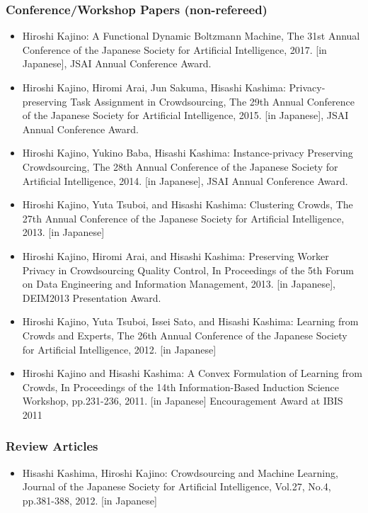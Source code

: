 \documentclass[a4paper,9pt]{article}
\begin{document}
\subsubsection*{Conference/Workshop Papers (non-refereed)}
\begin{itemize}
 \item Hiroshi Kajino: A Functional Dynamic Boltzmann Machine, The 31st Annual Conference of the Japanese Society for Artificial Intelligence, 2017. [in Japanese], JSAI Annual Conference Award.
 \item Hiroshi Kajino, Hiromi Arai, Jun Sakuma, Hisashi Kashima: Privacy-preserving Task Assignment in Crowdsourcing, The 29th Annual Conference of the Japanese Society for Artificial Intelligence, 2015. [in Japanese], JSAI Annual Conference Award.
 \item Hiroshi Kajino, Yukino Baba, Hisashi Kashima: Instance-privacy Preserving Crowdsourcing, The 28th Annual Conference of the Japanese Society for Artificial Intelligence, 2014. [in Japanese], JSAI Annual Conference Award.
 \item Hiroshi Kajino, Yuta Tsuboi, and Hisashi Kashima: Clustering Crowds, The 27th Annual Conference of the Japanese Society for Artificial Intelligence, 2013. [in Japanese]
 \item Hiroshi Kajino, Hiromi Arai, and Hisashi Kashima: Preserving Worker Privacy in Crowdsourcing Quality Control, In Proceedings of the 5th Forum on Data Engineering and Information Management, 2013. [in Japanese], DEIM2013 Presentation Award.
 \item Hiroshi Kajino, Yuta Tsuboi, Issei Sato, and Hisashi Kashima: Learning from Crowds and Experts, The 26th Annual Conference of the Japanese Society for Artificial Intelligence, 2012. [in Japanese]
 \item Hiroshi Kajino and Hisashi Kashima: A Convex Formulation of Learning from Crowds, In Proceedings of the 14th Information-Based Induction Science Workshop, pp.231-236, 2011. [in Japanese] Encouragement Award at IBIS 2011
\end{itemize}

\subsubsection*{Review Articles}
\begin{itemize}
 \item Hisashi Kashima, Hiroshi Kajino: Crowdsourcing and Machine Learning, Journal of the Japanese Society for Artificial Intelligence, Vol.27, No.4, pp.381-388, 2012. [in Japanese]
\end{itemize}
\end{document}
